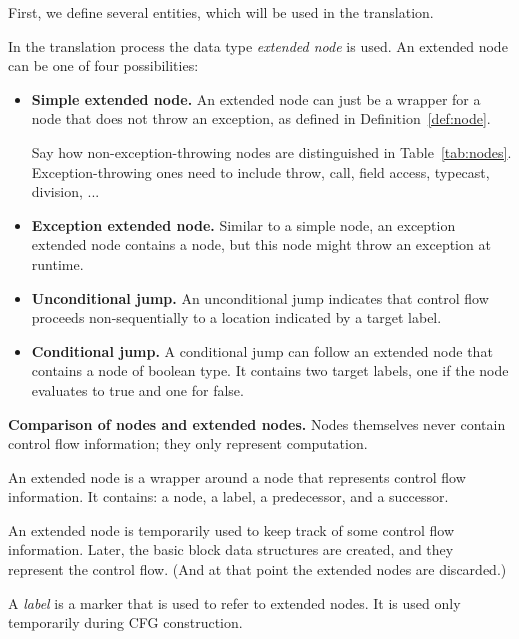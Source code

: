 First, we define several entities, which will be used in the translation.

\begin{definition}
    In the translation process the data type \emph{extended node} is used.
    An extended node can be one of four possibilities:
    \begin{itemize}
        \item \textbf{Simple extended node.} An extended node can just be a
          wrapper for a node that does not throw an exception,
        as defined in Definition~\ref{def:node}.
        \begin{workinprogress}
          Say how non-exception-throwing nodes are distinguished in
          Table~\autoref{tab:nodes}.  Exception-throwing ones need to
          include throw, call, field access, typecast, division, ...
        \end{workinprogress}
        \item \textbf{Exception extended node.} Similar to a simple
          node, an exception extended node contains a node, but this
          node might throw an exception at runtime.
        \item \textbf{Unconditional jump.} An unconditional jump
          indicates that control flow proceeds non-sequentially to a
          location indicated by a target label.
        \item \textbf{Conditional jump.} A conditional jump can follow
          an extended node that contains a node of boolean type. It
          contains two target labels, one if the node evaluates to
          true and one for false.
    \end{itemize}
\end{definition}

\textbf{Comparison of nodes and extended nodes.}
Nodes themselves never contain control flow information; they only
represent computation.

An extended node is a wrapper around a node that represents control flow
information.  It contains:  a node, a label, a predecessor, and a
successor.

An extended node is temporarily used to keep track of some control flow
information.  Later, the basic block data structures are created, and they
represent the control flow.  (And at that point the extended nodes are
discarded.)
\begin{definition}[Label]
    A \emph{label} is a marker that is used to refer to extended
    nodes. It is used only temporarily during CFG construction.
\end{definition}

